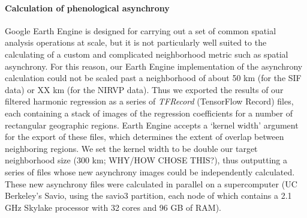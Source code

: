 \documentclass[12pt]{article}
\begin{document}
\paragraph*{Calculation of phenological asynchrony}
Google Earth Engine is designed for carrying out a set of common spatial
analysis operations at scale, but it is not particularly well suited to
the calculating of a custom and complicated neighborhood metric such as
spatial asynchrony. For this reason, our Earth Engine implementation of
the asynchrony calculation could not be scaled past a neighborhood of
about 50 km (for the SIF data) or XX km (for the NIRVP data). Thus we
exported the results of our filtered harmonic regression as a series of
\textit{TFRecord} (TensorFlow Record) files, each containing a stack of images of
the regression coefficients for a number of rectangular geographic
regions. Earth Engine accepts a ‘kernel width’ argument for the export of
these files, which determines the extent of overlap between neighboring
regions. We set the kernel width to be double our target neighborhood
size (300 km; WHY/HOW CHOSE THIS?), thus outputting a series of files
whose new asynchrony images could be independently calculated. These new
asynchrony files were calculated in parallel on a supercomputer (UC
Berkeley’s Savio, using the savio3 partition, each node of which contains
a 2.1 GHz Skylake processor with 32 cores and 96 GB of RAM).
\end{document}
